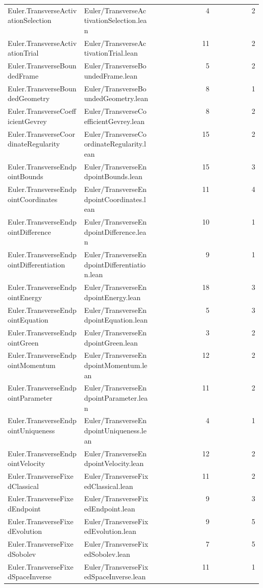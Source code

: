 \begin{longtable}{p{0.30\linewidth}p{0.28\linewidth}rr}
Euler.TransverseActivationSelection & Euler/TransverseActivationSelection.lean & 4 & 2\\
Euler.TransverseActivationTrial & Euler/TransverseActivationTrial.lean & 11 & 2\\
Euler.TransverseBoundedFrame & Euler/TransverseBoundedFrame.lean & 5 & 2\\
Euler.TransverseBoundedGeometry & Euler/TransverseBoundedGeometry.lean & 8 & 1\\
Euler.TransverseCoefficientGevrey & Euler/TransverseCoefficientGevrey.lean & 8 & 2\\
Euler.TransverseCoordinateRegularity & Euler/TransverseCoordinateRegularity.lean & 15 & 2\\
Euler.TransverseEndpointBounds & Euler/TransverseEndpointBounds.lean & 15 & 3\\
Euler.TransverseEndpointCoordinates & Euler/TransverseEndpointCoordinates.lean & 11 & 4\\
Euler.TransverseEndpointDifference & Euler/TransverseEndpointDifference.lean & 10 & 1\\
Euler.TransverseEndpointDifferentiation & Euler/TransverseEndpointDifferentiation.lean & 9 & 1\\
Euler.TransverseEndpointEnergy & Euler/TransverseEndpointEnergy.lean & 18 & 3\\
Euler.TransverseEndpointEquation & Euler/TransverseEndpointEquation.lean & 5 & 3\\
Euler.TransverseEndpointGreen & Euler/TransverseEndpointGreen.lean & 3 & 2\\
Euler.TransverseEndpointMomentum & Euler/TransverseEndpointMomentum.lean & 12 & 2\\
Euler.TransverseEndpointParameter & Euler/TransverseEndpointParameter.lean & 11 & 2\\
Euler.TransverseEndpointUniqueness & Euler/TransverseEndpointUniqueness.lean & 4 & 1\\
Euler.TransverseEndpointVelocity & Euler/TransverseEndpointVelocity.lean & 12 & 2\\
Euler.TransverseFixedClassical & Euler/TransverseFixedClassical.lean & 11 & 2\\
Euler.TransverseFixedEndpoint & Euler/TransverseFixedEndpoint.lean & 9 & 3\\
Euler.TransverseFixedEvolution & Euler/TransverseFixedEvolution.lean & 9 & 5\\
Euler.TransverseFixedSobolev & Euler/TransverseFixedSobolev.lean & 7 & 5\\
Euler.TransverseFixedSpaceInverse & Euler/TransverseFixedSpaceInverse.lean & 11 & 1\\

\end{longtable}
